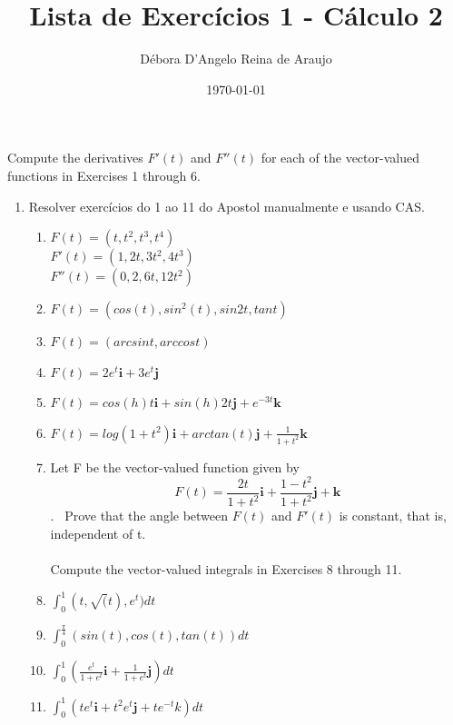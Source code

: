 \documentclass{article}
\begin{document}
\title{Lista de Exercícios 1 - Cálculo 2}
\author{Débora D'Angelo Reina de Araujo}
\date{\today}

\maketitle

Compute the derivatives $F'(t)$ and $F''(t)$ for each of the vector-valued functions in Exercises 1 through 6.

\begin{enumerate}
    \item Resolver exercícios do 1 ao 11 do Apostol manualmente e usando CAS.
        \begin{enumerate}[label=1.\arabic*.]
            \item $F(t) = (t, t^2, t^3, t^4)$ \\
            $F'(t) = (1, 2t, 3t^2, 4t^3)$ \\
            $F''(t) = (0, 2, 6t, 12t^2)$ \
            \item $F(t) = (cos(t), sin^2(t), sin 2t, tan t)$ \
            \item $F(t) = (arcsin t, arccos t)$ \
            \item $F(t) = 2e^t\textbf{i} + 3e^t\textbf{j}$ \
            \item $F(t) = cos(h) t \textbf{i} + sin(h) 2t \textbf{j} + e^{-3t}\textbf{k}$ \
            \item $F(t) = log(1+t^2)\textbf{i} + arctan(t) \textbf{j} + \frac{1}{1+t^2}\textbf{k}$ \
            \item Let F be the vector-valued function given by \\
                $$F(t) = \frac{2t}{1+t^2}\textbf{i} + \frac{1-t^2}{1+t^2}\textbf{j} + \textbf{k}$$. \
                Prove that the angle between $F(t)$ and $F'(t)$ is constant, that is, independent of t. \\
                \\
            Compute the vector-valued integrals in Exercises 8 through 11. \
            \item $\int_{0}^{1} (t, \sqrt(t), e^t)dt$ \
            \item $\int_{0}^{\frac{\pi}{4}} (sin(t), cos(t), tan(t))dt$ \
            \item $\int_{0}^{1} (\frac{e^t}{1+e^t}\textbf{i} + \frac{1}{1+e^t}\textbf{j})dt$ \
            \item $\int_{0}^{1} (te^t\textbf{i} + t^2e^t\textbf{j} + te^{-t}k)dt$
        \end{enumerate}

\end{enumerate}
\end{document}
